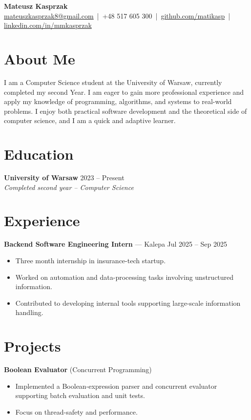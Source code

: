 \documentclass[a4paper,10pt]{article}
\begin{document}
\begin{center}
    {\LARGE \textbf{Mateusz Kasprzak}} \\[2pt]
    \href{mailto:mateuszkasprzak8@gmail.com}{mateuszkasprzak8@gmail.com} \,|\, 
    +48 517 605 300 \,|\, 
    \href{https://github.com/matikasp}{github.com/matikasp} \,|\, 
    \href{https://linkedin.com/in/mmkasprzak}{linkedin.com/in/mmkasprzak}
\end{center}
\vspace{-6pt}


\section*{About Me}
I am a Computer Science student at the University of Warsaw, currently completed my second Year. I am eager to gain more professional experience and apply my knowledge of programming, algorithms, and systems to real-world problems. I enjoy both practical software development and the theoretical side of computer science, and I am a quick and adaptive learner.

\section*{Education}
\textbf{University of Warsaw} \hfill 2023 -- Present \\
\emph{Completed second year -- Computer Science}

\section*{Experience}
\textbf{Backend Software Engineering Intern} — Kalepa \hfill Jul 2025 -- Sep 2025
\begin{itemize}[left=0pt, noitemsep]
    \item Three month internship in insurance-tech startup.
    \item Worked on automation and data-processing tasks involving unstructured information.
    \item Contributed to developing internal tools supporting large-scale information handling.
\end{itemize}

\section*{Projects}
\textbf{Boolean Evaluator} \hfill (Concurrent Programming)
\begin{itemize}[left=0pt, noitemsep]
    \item Implemented a Boolean-expression parser and concurrent evaluator supporting batch evaluation and unit tests.
    \item Focus on thread-safety and performance.
\end{itemize}
\end{document}

